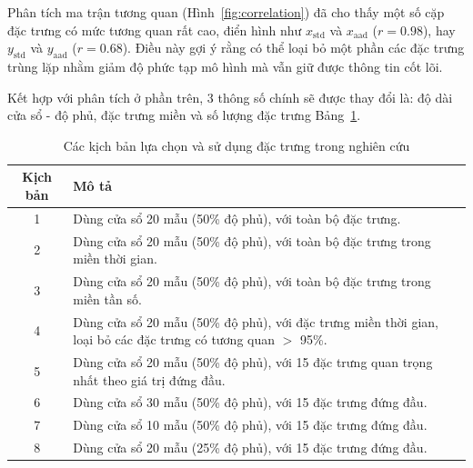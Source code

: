 Phân tích ma trận tương quan (Hình~\ref{fig:correlation}) đã cho thấy một số
cặp đặc trưng có mức tương quan rất cao, điển hình như $x_{\mathrm{std}}$ và
$x_{\mathrm{aad}}$ ($r = 0.98$), hay $y_{\mathrm{std}}$ và $y_{\mathrm{aad}}$
($r = 0.68$). Điều này gợi ý rằng có thể loại bỏ một phần các đặc trưng trùng
lặp nhằm giảm độ phức tạp mô hình mà vẫn giữ được thông tin cốt lõi.

Kết hợp với phân tích ở phần trên, 3 thông số chính sẽ được thay đổi là: độ dài
cửa sổ - độ phủ, đặc trưng miền và số lượng đặc trưng Bảng~\ref{tab:scenarios}.

\begin{table}[H]
    \caption{Các kịch bản lựa chọn và sử dụng đặc trưng trong nghiên cứu}
    \label{tab:scenarios}
    \begin{center}
        \renewcommand{\arraystretch}{1.2}
        \begin{tabular}{|c|p{10cm}|}
            \hline
            \textbf{Kịch bản} & \textbf{Mô tả}                                                                                                \\
            \hline
            1                 & Dùng cửa sổ 20 mẫu (50\% độ phủ), với toàn bộ đặc trưng.                                                      \\
            \hline
            2                 & Dùng cửa sổ 20 mẫu (50\% độ phủ), với toàn bộ đặc trưng trong miền thời gian.                                 \\
            \hline
            3                 & Dùng cửa sổ 20 mẫu (50\% độ phủ), với toàn bộ đặc trưng trong miền tần số.                                    \\
            \hline
            4                 & Dùng cửa sổ 20 mẫu (50\% độ phủ), với đặc trưng miền thời gian, loại bỏ các đặc trưng có tương quan $>$ 95\%. \\
            \hline
            5                 & Dùng cửa sổ 20 mẫu (50\% độ phủ), với 15 đặc trưng quan trọng nhất theo giá trị đứng đầu.                     \\
            \hline
            6                 & Dùng cửa sổ 30 mẫu (50\% độ phủ), với 15 đặc trưng đứng đầu.                                                  \\
            \hline
            7                 & Dùng cửa sổ 10 mẫu (50\% độ phủ), với 15 đặc trưng đứng đầu.                                                  \\
            \hline
            8                 & Dùng cửa sổ 20 mẫu (25\% độ phủ), với 15 đặc trưng đứng đầu.                                                  \\
            \hline
        \end{tabular}
    \end{center}
\end{table}
